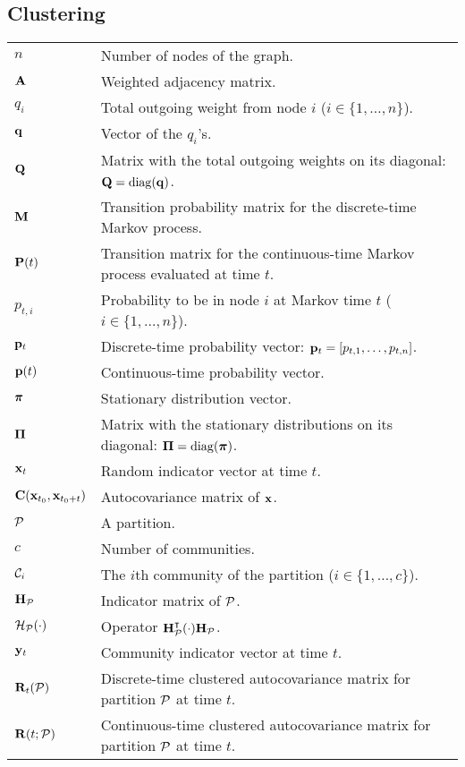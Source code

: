 \subsection*{Clustering}
\begin{table}[H]
\begin{tabular}{ll}
	$n$ & Number of nodes of the graph.\\
	$\b A$ & Weighted adjacency matrix.\\
	$q_i$ & Total outgoing weight from node $i$ ($i \in \{1,\dots,n\}$).\\
	$\b q$ & Vector of the $q_i$'s.\\
	$\b Q$ & Matrix with the total outgoing weights on its diagonal: $\b Q = \diag(\b q)$.\\
	$\b M$ & Transition probability matrix for the discrete-time Markov process.\\
	$\b P(t)$ & Transition matrix for the continuous-time Markov process evaluated at time $t$.\\
	$p_{t,i}$ & Probability to be in node $i$ at Markov time $t$ ($i \in \{1,\dots,n\}$).\\
	$\b p_t$ & Discrete-time probability vector: $\b p_t = [p_{t,1},\dots,p_{t,n}]$.\\
	$\b p(t)$ & Continuous-time probability vector.\\
	$\bs \pi$ & Stationary distribution vector.\\
	$\bs \Pi$ & Matrix with the stationary distributions on its diagonal: $\bs \Pi = \diag(\bs \pi)$.\\
	$\b x_t$ & Random indicator vector at time $t$.\\
	$\b C(\b x_{t_0},\b x_{t_0+t})$ & Autocovariance matrix of $\b x$.\\
	$\P$ & A partition.\\
	$c$ & Number of communities.\\
	$\C_i$ & The $i$th community of the partition ($i \in \{1,\dots,c\}$).\\
	$\b H_{\P}$ & Indicator matrix of $\P$.\\
	$\mathcal{H}_{\P}(\cdot)$ & Operator $\b H_\P^\t (\cdot) \b H_\P$.\\
	$\b y_t$ & Community indicator vector at time $t$.\\
	$\b R_t(\P)$ & Discrete-time clustered autocovariance matrix for partition $\P$ at time $t$.\\
	$\b R(t;\P)$ & Continuous-time clustered autocovariance matrix for partition $\P$ at time $t$.\\

\end{tabular}
\end{table}

